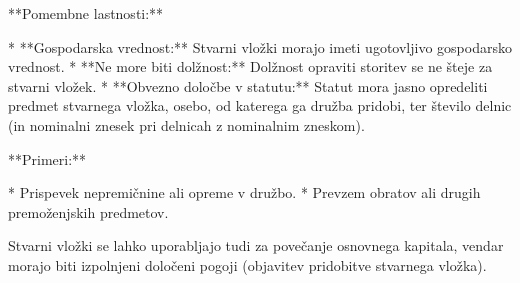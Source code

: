 \documentclass[a4paper,12pt,openright]{book}
\begin{document}
**Pomembne lastnosti:**

* **Gospodarska vrednost:** Stvarni vložki morajo imeti ugotovljivo gospodarsko vrednost.
* **Ne more biti dolžnost:** Dolžnost opraviti storitev se ne šteje za stvarni vložek.
* **Obvezno določbe v statutu:** Statut mora jasno opredeliti predmet stvarnega vložka, osebo, od katerega ga družba pridobi, ter število delnic (in nominalni znesek pri delnicah z nominalnim zneskom).

**Primeri:**

* Prispevek nepremičnine ali opreme v družbo.
* Prevzem obratov ali drugih premoženjskih predmetov.


Stvarni vložki se lahko uporabljajo tudi za povečanje osnovnega kapitala, vendar morajo biti izpolnjeni določeni pogoji (objavitev pridobitve stvarnega vložka).
\end{document}
